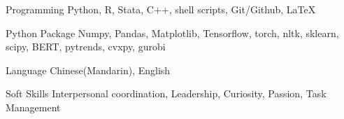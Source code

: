 

\begin{cvskills}

  \cvskill
    {Programming} %
    {Python, R, Stata, C++, shell scripts, Git/Github, \LaTeX} %

  \cvskill
    {Python Package} %
    {Numpy, Pandas, Matplotlib, Tensorflow, torch, nltk, sklearn, scipy, BERT, pytrends, cvxpy,
    gurobi}
    
  \cvskill
    {Language} %
    {Chinese(Mandarin), English} %
    
  \cvskill
    {Soft Skills} %
    {Interpersonal coordination, Leadership, Curiosity, Passion, Task Management} %

\end{cvskills}
